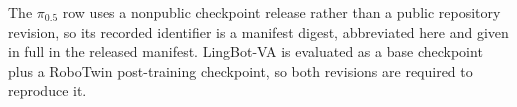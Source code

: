 \documentclass[letterpaper,10pt,conference]{ieeeconf}%
\begin{document}
The $\pi_{0.5}$ row uses a nonpublic checkpoint release rather than a public repository revision, so its recorded identifier is a manifest digest, abbreviated here and given in full in the released manifest. LingBot-VA is evaluated as a base checkpoint plus a RoboTwin post-training checkpoint, so both revisions are required to reproduce it.
\end{document}

